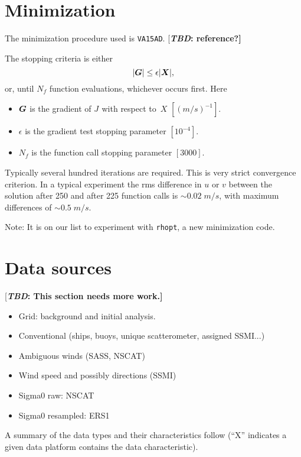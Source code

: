 \documentclass[11pt]{article}
\newcommand{\computer}[1]{{\tt #1}}
\newcommand{\J}[1]{\mbox{$ J_{#1} $}}
\newcommand{\mks}[2]{\mbox{$ {#1} \; {#2} $}}
\newcommand{\Vector}[1]{\mbox{\boldmath ${#1}$}}
\newcommand{\wrt}{with respect to}
\newcommand{\xx}[1]{\section {#1}}
\newcommand{\TBD}[1]{{[\bfseries{\itshape{TBD: }{{#1}}}]}}
\newcommand{\eql}[2]{\begin{equation} \label{eq:#1} #2 \end{equation}}
\newcommand{\COMMENT}[2]{{[\bfseries {\itshape #1}: {#2}]}}
\renewcommand{\TBD}[1]{\COMMENT{TBD}{{#1}}}
\newcommand{\vardef}[3]{\item $ {#1} $ is the {#2} $ [{#3}] $. }
\begin{document}
\xx {Minimization}

The minimization procedure used is \computer{VA15AD}.
 \TBD{reference?}

The stopping criteria is either
 \eql{stopping}{ |\Vector{G}| \leq \epsilon |\Vector{X}| , }
 or, until $N_f$ function evaluations, whichever occurs first.
 Here \begin{itemize}
  \vardef{ \Vector{G}}{gradient of \J{} \wrt\ \Vector{X}}{(m/s)^{-1}}
  \vardef{\epsilon}{gradient test stopping parameter}{10^{-4}}
  \vardef{N_f}{function call stopping parameter}{3000}
 \end{itemize} 

Typically several hundred iterations are required.  This is very
strict convergence criterion.  In a typical experiment the rms
difference in $u$ or $v$ between the solution after 250 and after 225
function calls is \mks{\sim 0.02}{m/s}, with maximum differences of
\mks{\sim 0.5}{m/s}.

Note: It is on our list to experiment with \computer{rhopt}, a new
minimization code.

\xx {Data sources}

\TBD{This section needs more work.}

\begin{itemize}
\item Grid: background and initial analysis.
\item Conventional (ships, buoys, unique scatterometer, assigned SSMI...)
\item Ambiguous winds (SASS, NSCAT)
\item Wind speed and possibly directions (SSMI)
\item Sigma0 raw: NSCAT
\item Sigma0 resampled: ERS1
\end{itemize}

A summary of the data types and their characteristics follow (``X''
indicates a given data platform contains the data characteristic).
\end{document}
